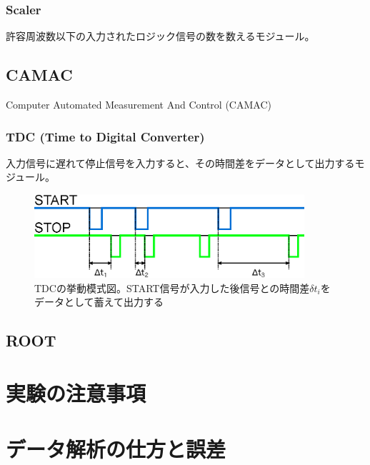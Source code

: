 \documentclass{jarticle}
\begin{document}
	  
   \subsubsection*{Scaler}
	  
	  許容周波数以下の入力されたロジック信号の数を数えるモジュール。
	  
	  
	  
	  

  \subsection{CAMAC}
  Computer Automated Measurement And Control (CAMAC)

  \subsubsection*{TDC (Time to Digital Converter)}

  入力信号に遅れて停止信号を入力すると、その時間差をデータとして出力するモジュール。

	  \begin{figure}[H]
	   \begin{center}
	    \includegraphics[width = 100mm]{./picture/TDC.eps}
	   \end{center}
	   \caption{TDCの挙動模式図。START信号が入力した後信号との時間差$\delta t_{i}$をデータとして蓄えて出力する}
	   \label{Fig:TDC}
	  \end{figure}


  
  	  \subsection{ROOT}
	  
 	  \section{実験の注意事項}
	  
 \section{データ解析の仕方と誤差}
 
\end{document}
